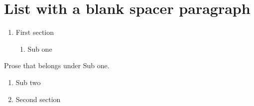 \documentclass[11pt,a4paper]{article}
\begin{document}
\section{List with a blank spacer paragraph}

\begin{enumerate}
\item First section
  \begin{enumerate}
\item Sub one
  \end{enumerate}
\end{enumerate}

Prose that belongs under Sub one.

\begin{enumerate}
\item Sub two
\item Second section
\end{enumerate}
\end{document}
